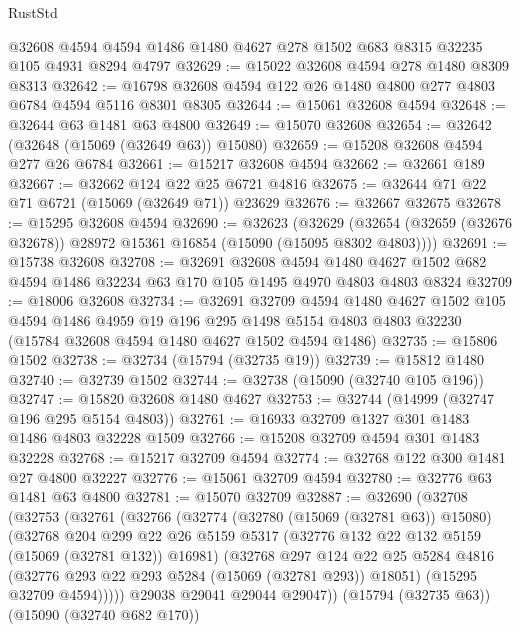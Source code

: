 \begin{lexlean}{RustStd}
\begin{coremodule}
    @32608
    @4594
    @4594
    @1486
    @1480
    @4627
    @278
    @1502
    @683
    @8315
    @32235
    @105
    @4931
    @8294
    @4797
@32629 := @15022 @32608 @4594 @278 @1480 @8309 @8313
@32642 := @16798 @32608 @4594 @122 @26 @1480 @4800 @277 @4803 @6784 @4594 @5116 @8301 @8305
@32644 := @15061 @32608 @4594
@32648 := @32644 @63 @1481 @63 @4800
@32649 := @15070 @32608
@32654 := @32642 (@32648 (@15069 (@32649 @63)) @15080)
@32659 := @15208 @32608 @4594 @277 @26 @6784
@32661 := @15217 @32608 @4594
@32662 := @32661 @189
@32667 := @32662 @124 @22 @25 @6721 @4816
@32675 := @32644 @71 @22 @71 @6721 (@15069 (@32649 @71)) @23629
@32676 := @32667 @32675
@32678 := @15295 @32608 @4594
@32690 := @32623
    (@32629 (@32654 (@32659 (@32676 @32678)) @28972 @15361 @16854 (@15090 (@15095 @8302 @4803))))
@32691 := @15738 @32608
@32708 := @32691
    @32608
    @4594
    @1480
    @4627
    @1502
    @682
    @4594
    @1486
    @32234
    @63
    @170
    @105
    @1495
    @4970
    @4803
    @4803
    @8324
@32709 := @18006 @32608
@32734 := @32691
    @32709
    @4594
    @1480
    @4627
    @1502
    @105
    @4594
    @1486
    @4959
    @19
    @196
    @295
    @1498
    @5154
    @4803
    @4803
    @32230
    (@15784 @32608 @4594 @1480 @4627 @1502 @4594 @1486)
@32735 := @15806 @1502
@32738 := @32734 (@15794 (@32735 @19))
@32739 := @15812 @1480
@32740 := @32739 @1502
@32744 := @32738 (@15090 (@32740 @105 @196))
@32747 := @15820 @32608 @1480 @4627
@32753 := @32744 (@14999 (@32747 @196 @295 @5154 @4803))
@32761 := @16933 @32709 @1327 @301 @1483 @1486 @4803 @32228 @1509
@32766 := @15208 @32709 @4594 @301 @1483 @32228
@32768 := @15217 @32709 @4594
@32774 := @32768 @122 @300 @1481 @27 @4800 @32227
@32776 := @15061 @32709 @4594
@32780 := @32776 @63 @1481 @63 @4800
@32781 := @15070 @32709
@32887 := @32690
    (@32708
      (@32753
        (@32761
          (@32766
            (@32774
              (@32780 (@15069 (@32781 @63)) @15080)
              (@32768
                @204
                @299
                @22
                @26
                @5159
                @5317
                (@32776 @132 @22 @132 @5159 (@15069 (@32781 @132)) @16981)
                (@32768
                  @297
                  @124
                  @22
                  @25
                  @5284
                  @4816
                  (@32776 @293 @22 @293 @5284 (@15069 (@32781 @293)) @18051)
                  (@15295 @32709 @4594)))))
          @29038
          @29041
          @29044
          @29047))
      (@15794 (@32735 @63))
      (@15090 (@32740 @682 @170))

\end{coremodule}
\end{lexlean}
